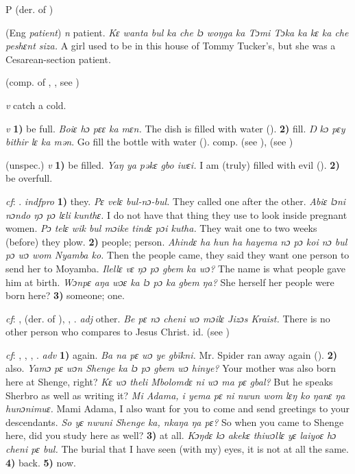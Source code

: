 \begin{letter}{P}
 (der. of ) 

 (Eng \textit{patient}) \textit{n} patient. \textit{Kɛ wanta bul ka che lɔ woŋga ka Tɔmi Tɔka ka kɛ ka che peshɛnt siza.} A girl used to be in this house of Tommy Tucker's, but she was a Cesarean-section patient.

 (comp. of , , see ) 

 \textit{v} catch a cold.

 \textit{v} \textbf{1)} be full. \textit{Boiɛ hɔ pɛɛ ka mɛn.} The dish is filled with water (\citealt{Pichl1967}). \textbf{2)} fill. \textit{Ŋ kɔ pɛy bithir lɛ ka mən}. Go fill the bottle with water (\citealt{Pichl1967}). comp.  (see ),  (see ) 

 (unspec.) \textit{v} \textbf{1)} be filled. \textit{Yaŋ ya pəkɛ gbo iwɛi.} I am (truly) filled with evil (\citealt{Pichl1967}). \textbf{2)} be overfull.

 \textit{cf}: . \textit{indfpro} \textbf{1)} they. \textit{Pɛ velɛ bul-nɔ-bul.} They called one after the other. \textit{Abiɛ lɔni nɔndo ŋɔ pɔ lɛli kunthɛ.} I do not have that thing they use to look inside pregnant women. \textit{Pɔ telɛ wik bul mɔike tindɛ pɔi kutha.} They wait one to two weeks (before) they plow. \textbf{2)} people; person. \textit{Ahindɛ ha hun ha hayema nɔ pɔ koi nɔ bul pɔ wɔ wom Nyamba ko.} Then the people came, they said they want one person to send her to Moyamba. \textit{Ilellɛ vɛ ŋɔ pɔ gbem ka wɔ?} The name is what people gave him at birth. \textit{Wɔnpɛ aŋa wɔɛ ka lɔ pɔ ka gbem ŋa?} She herself her people were born here? \textbf{3)} someone; one.

 \textit{cf}: ,  (der. of ), , . \textit{adj} other. \textit{Be pɛ nɔ cheni wɔ mɔilɛ Jizɔs Kraist.} There is no other person who compares to Jesus Christ. id.  (see ) 

 \textit{cf}: , , , . \textit{adv} \textbf{1)} again. \textit{Ba na pɛ wɔ ye gbïkni.} Mr. Spider ran away again (\citealt{Pichl1967}). \textbf{2)} also. \textit{Yamɔ pɛ wɔn Shenge ka lɔ pɔ gbem wɔ hinye?} Your mother was also born here at Shenge, right? \textit{Kɛ wɔ theli Mbolomdɛ ni wɔ ma pɛ gbal?} But he speaks Sherbro as well as writing it? \textit{Mi Adama, i yema pɛ ni nwun wom lɛŋ ko ŋanɛ ŋa hunɔnimuɛ.} Mami Adama, I also want for you to come and send greetings to your descendants. \textit{So yɛ nwuni Shenge ka, nkaŋa ŋa pɛ?} So when you came to Shenge here, did you study here as well? \textbf{3)} at all. \textit{Kɔŋdɛ kɔ akekɛ thiwɔllɛ yɛ laiyoɛ hɔ cheni pɛ bul.} The burial that I have seen (with my) eyes, it is not at all the same. \textbf{4)} back. \textbf{5)} now.


\end{letter}
